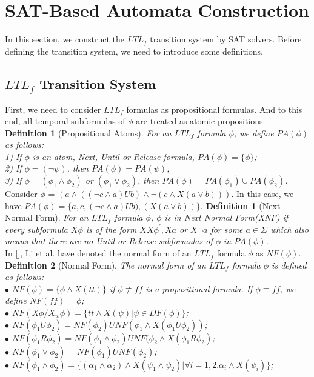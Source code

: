 \section{SAT-Based Automata Construction}
In this section, we construct the $LTL_f$ transition system by SAT solvers. Before defining the transition system, we need to introduce some definitions.\\
\subsection{$LTL_f$ Transition System}
First, we need to consider $LTL_f$ formulas as propositional formulas. And to this end, all temporal subformulas of $\phi$ are treated as atomic propositions. \\
{\bf Definition 1} (Propositional Atoms). {\it For an $LTL_f$ formula $\phi$, we define $PA(\phi)$ as follows:\\
1) If $\phi$ is an atom, Next, Until or Release formula, $PA(\phi)=\{\phi\}$;\\
2) If $\phi = (\neg \psi)$, then $PA(\phi)= PA(\psi)$;\\
3) If $\phi = (\phi_1 \wedge \phi_2)$ or $(\phi_1 \vee \phi_2)$, then $PA(\phi) = PA(\phi_1) \cup PA(\phi_2)$.
}     \\
Consider $\phi$ = $(a \wedge ((\neg c \wedge a)U b) \wedge \neg(c \wedge X (a \vee b)))$. In this case, we have $PA(\phi)=\{a, c, (\neg c \wedge a)U b), (X (a \vee b))\}$. 
{\bf Definition 1} (Next Normal Form). {\it For an $LTL_f$ formula $\phi$, $\phi$ is in Next Normal Form(XNF) if every subformula $X \phi$ is of the form $X X \phi^{\prime}, X a$ or $X \neg a$ for some $a \in \Sigma$ which also means that there are no Until or Release subformulas of $\phi$ in $PA(\phi)$. }     \\
In [], Li et al. have denoted the normal form of an $LTL_f$ formula $\phi$ as $NF(\phi)$.\\
{\bf Definition 2} (Normal Form). {\it The normal form of an $LTL_f$ formula $\phi$ is defined as follows: \\
$\bullet$ $NF(\phi) = \{\phi \wedge X(tt)\}$ if $\phi \not \equiv ff$ is a propositional formula. If $\phi \equiv ff$, we define   $NF(ff) = \phi$;\\
$\bullet$ $NF(X\phi/X_{w}\phi) = \{tt \wedge X(\psi)| \psi \in DF(\phi)\}$; \\
$\bullet$ $NF(\phi_1 U \phi_2) = NF(\phi_2) U NF(\phi_1 \wedge X(\phi_1 U \phi_2))$; \\
$\bullet$  $NF(\phi_1 R \phi_2) = NF(\phi_1 \wedge \phi_2) U NF(\phi_2 \wedge X(\phi_1 R \phi_2)$; \\
$\bullet$ $NF(\phi_1 \vee \phi_2) = NF(\phi_1) U NF(\phi_2)$; \\
$\bullet$ $NF(\phi_1 \wedge \phi_2) = \{(\alpha_1 \wedge \alpha_2) \wedge X(\psi_1 \wedge \psi_2)| \forall i = 1,2. \alpha_i \wedge X(\psi_i)\}$; \\

}

